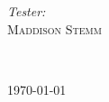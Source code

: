 \begin{titlepage}
\begin{center}
\begin{minipage}{0.4\textwidth}
\begin{flushleft} \large
\emph{Tester:}\\
 \textsc{Maddison Stemm}
\end{flushleft}
\end{minipage}
\begin{minipage}{0.4\textwidth}
\begin{flushright} \large
\end{flushright}
\end{minipage}\\

\vfill

{\large \today}

\end{center}
\end{titlepage}



